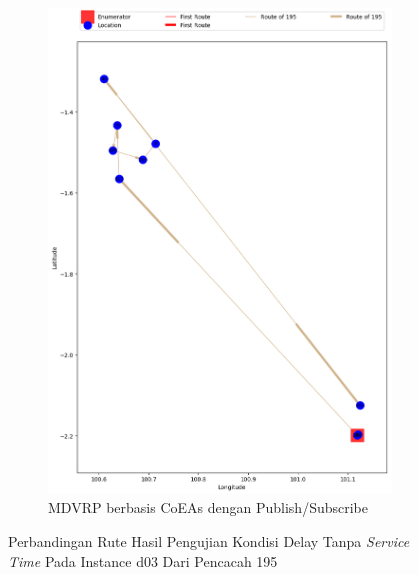 \begin{figure}[H]\ContinuedFloat
	\centering
	\begin{subfigure}[t]{\textwidth}
		\centering
		\includegraphics[width=\textwidth]{Resources/Images/delayed_3/real_m15_n100_delayed_3_195_pubsub_coes}
		\caption{MDVRP berbasis CoEAs dengan Publish/Subscribe}
		\label{fig:real_m15_n100_delayed_3_195_pubsub_coes}
	\end{subfigure}
	\caption{Perbandingan Rute Hasil Pengujian Kondisi Delay Tanpa \textit{Service Time} Pada Instance d03 Dari Pencacah 195}
	\label{fig:real_m15_n100_delayed_3_195_contd}
\end{figure}



